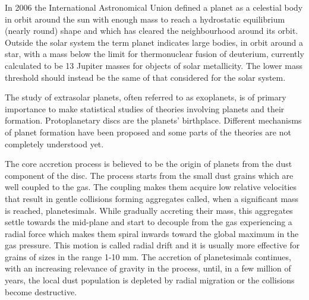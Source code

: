 \documentclass[a4paper,10pt]{report}
\begin{document}

In 2006 the International Astronomical Union defined a planet as a celestial body in orbit around the sun with enough mass 
to reach a hydrostatic equilibrium (nearly round) shape and which has cleared the neighbourhood around its orbit. Outside the solar system 
the term planet indicates large bodies, in orbit around a star,
with a mass below the limit for thermonuclear fusion of deuterium, 
currently calculated to be 13 Jupiter masses for objects of solar metallicity. The lower mass threshold should instead be the same of that considered
for the solar system.

The study of extrasolar planets, often referred to as exoplanets, is of primary importance to make statistical studies of theories 
involving planets and their formation. Protoplanetary discs are the planets' birthplace. 
Different mechanisms of planet formation have been proposed and some parts of the theories are not completely
understood yet. 

The core accretion process \citep[pp. 25-26]{veronesi_phdthesis} is believed to be the origin of planets from the dust component of the disc. 
The process starts from the small dust grains which are well coupled to the gas.
The coupling makes them acquire low relative velocities that result in gentle collisions forming aggregates called, when a significant mass is reached, planetesimals.
While gradually accreting their mass, this aggregates settle towards the mid-plane and start to decouple from the gas experiencing a radial force 
which makes them spiral inwards toward the global maximum in the gas pressure. This motion is called radial drift and it is usually more effective for grains of sizes in the range 
1-10 mm.
The accretion of planetesimals continues, with an increasing relevance of gravity in the process,
until, in a few million of years, the local dust population is depleted by radial migration or the collisions become destructive.
\end{document}

